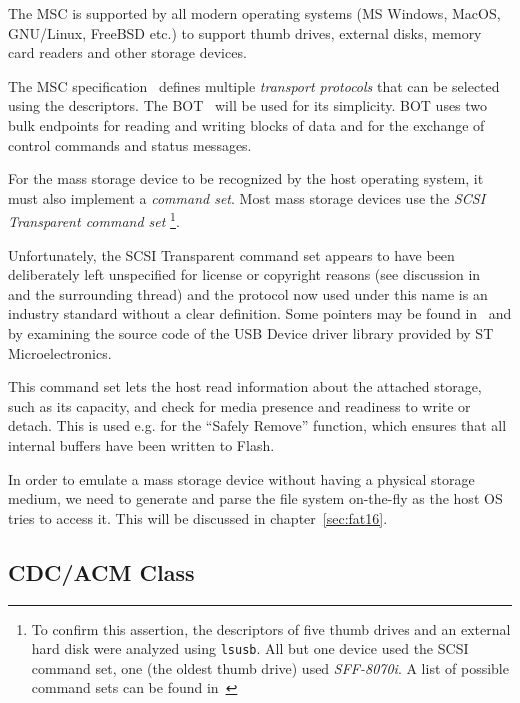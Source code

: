 The \gls{MSC} is supported by all modern operating systems (MS Windows, MacOS, GNU/Linux, FreeBSD etc.) to support thumb drives, external disks, memory card readers and other storage devices.


The \gls{MSC} specification~\cite{usbif-msco} defines multiple \textit{transport protocols} that can be selected using the descriptors. The \gls{BOT}~\cite{usbif-bot} will be used for its simplicity. \gls{BOT} uses two bulk endpoints for reading and writing blocks of data and for the exchange of control commands and status messages.

For the mass storage device to be recognized by the host operating system, it must also implement a \textit{command set}. Most mass storage devices use the \textit{\gls{SCSI} Transparent command set}
\footnote{To confirm this assertion, the descriptors of five thumb drives and an external hard disk were analyzed using \verb|lsusb|. All but one device used the SCSI command set, one (the oldest thumb drive) used \textit{SFF-8070i}. A list of possible command sets can be found in~\cite{usbif-msco}}.

Unfortunately, the \gls{SCSI} Transparent command set appears to have been deliberately left unspecified for license or copyright reasons (see discussion in~\cite{usb-tscsi-wtf} and the surrounding thread) and the protocol now used under this name is an industry standard without a clear definition. Some pointers may be found in~\cite{usb-tscsi} and by examining the source code of the USB Device driver library provided by ST Microelectronics.

This command set lets the host read information about the attached storage, such as its capacity, and check for media presence and readiness to write or detach. This is used e.g. for the ``Safely Remove'' function, which ensures that all internal buffers have been written to Flash.

In order to emulate a mass storage device without having a physical storage medium, we need to generate and parse the file system on-the-fly as the host \gls{OS} tries to access it. This will be discussed in chapter~\ref{sec:fat16}.

\subsection{CDC/ACM Class} \label{sec:cdc-acm}

